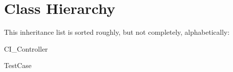 \section{Class Hierarchy}
This inheritance list is sorted roughly, but not completely, alphabetically\+:\begin{DoxyCompactList}
\item {}
\item C\+I\+\_\+\+Controller\begin{DoxyCompactList}
\item {}
\end{DoxyCompactList}
\item {}
\item Test\+Case\begin{DoxyCompactList}
\item {}
\begin{DoxyCompactList}
\item {}
\end{DoxyCompactList}
\end{DoxyCompactList}
\end{DoxyCompactList}
